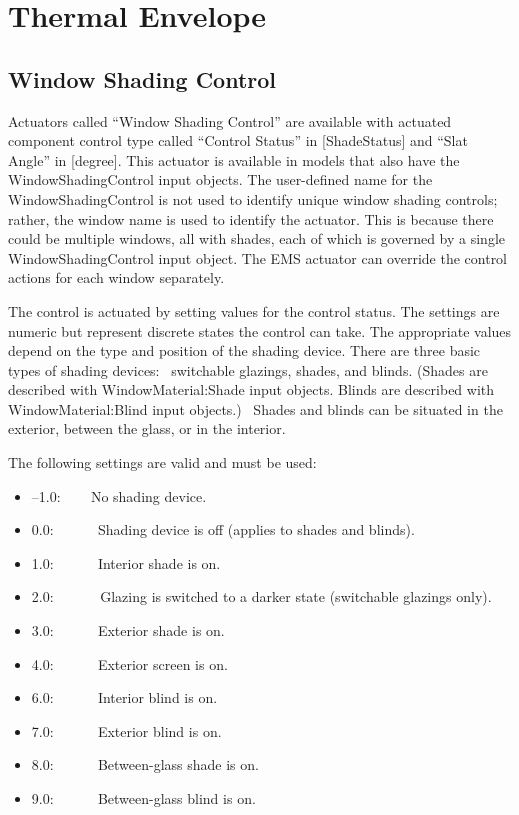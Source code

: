 \section{Thermal Envelope}\label{thermal-envelope}

\subsection{Window Shading Control}\label{window-shading-control}

Actuators called ``Window Shading Control'' are available with actuated component control type called ``Control Status'' in [ShadeStatus] and ``Slat Angle'' in [degree]. This actuator is available in models that also have the WindowShadingControl input objects. The user-defined name for the WindowShadingControl is not used to identify unique window shading controls; rather, the window name is used to identify the actuator. This is because there could be multiple windows, all with shades, each of which is governed by a single WindowShadingControl input object. The EMS actuator can override the control actions for each window separately.

The control is actuated by setting values for the control status. The settings are numeric but represent discrete states the control can take. The appropriate values depend on the type and position of the shading device. There are three basic types of shading devices:~ switchable glazings, shades, and blinds. (Shades are described with WindowMaterial:Shade input objects. Blinds are described with WindowMaterial:Blind input objects.)~ Shades and blinds can be situated in the exterior, between the glass, or in the interior.

The following settings are valid and must be used:

\begin{itemize}
\item
  --1.0: ~~~ No shading device.
\item
  0.0: ~~~~~ Shading device is off (applies to shades and blinds).
\item
  1.0: ~~~~~ Interior shade is on.
\item
  2.0:~~~~~~ Glazing is switched to a darker state (switchable glazings only).
\item
  3.0: ~~~~~ Exterior shade is on.
\item
  4.0: ~~~~~ Exterior screen is on.
\item
  6.0: ~~~~~ Interior blind is on.
\item
  7.0: ~~~~~ Exterior blind is on.
\item
  8.0: ~~~~~ Between-glass shade is on.
\item
  9.0: ~~~~~ Between-glass blind is on.
\end{itemize}

